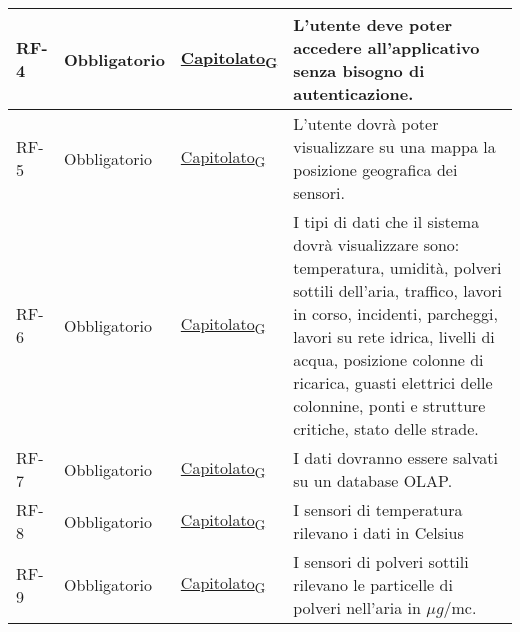 \begin{longtable}{|>{\centering\arraybackslash}m{}|>{\centering\arraybackslash}m{}|>{\centering\arraybackslash}m{}|>{\centering\arraybackslash}m{}|}
	RF-4            & Obbligatorio        & \href{https://7last.github.io/docs/rtb/documentazione-interna/glossario\#capitolato}{Capitolato\textsubscript{G}}     & L'utente deve poter accedere all'applicativo senza bisogno di autenticazione.                                                                                                                                                                                                                                      \\\hline
	RF-5            & Obbligatorio        & \href{https://7last.github.io/docs/rtb/documentazione-interna/glossario\#capitolato}{Capitolato\textsubscript{G}}     & L'utente dovrà poter visualizzare su una mappa la posizione geografica dei sensori.                                                                                                                                                                                                                                \\\hline
	RF-6            & Obbligatorio        & \href{https://7last.github.io/docs/rtb/documentazione-interna/glossario\#capitolato}{Capitolato\textsubscript{G}}     & I tipi di dati che il sistema dovrà visualizzare sono: temperatura, umidità, polveri sottili dell’aria, traffico, lavori in corso, incidenti, parcheggi, lavori su rete idrica, livelli di acqua, posizione colonne di ricarica, guasti elettrici delle colonnine, ponti e strutture critiche, stato delle strade. \\\hline
	RF-7            & Obbligatorio        & \href{https://7last.github.io/docs/rtb/documentazione-interna/glossario\#capitolato}{Capitolato\textsubscript{G}}     & I dati dovranno essere salvati su un database OLAP.                                                                                                                                                                                                                                                                \\\hline
	RF-8            & Obbligatorio        & \href{https://7last.github.io/docs/rtb/documentazione-interna/glossario\#capitolato}{Capitolato\textsubscript{G}}     & I sensori di temperatura rilevano i dati in Celsius                                                                                                                                                                                                                                                                \\\hline
	RF-9            & Obbligatorio        & \href{https://7last.github.io/docs/rtb/documentazione-interna/glossario\#capitolato}{Capitolato\textsubscript{G}}     & I sensori di polveri sottili rilevano le particelle di polveri nell’aria in $\mu g$/mc.                                                                                                                                                                                                                            \\\hline

\end{longtable}
